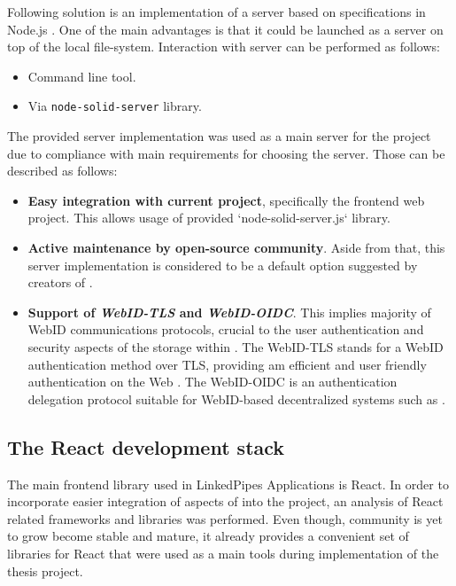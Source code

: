 Following solution is an implementation of a server based on \solid{} specifications in Node.js \cite{node_solid_server}.
One of the main advantages is that it could be launched as a \solid{} server on top of the local file-system. Interaction with server can be performed as follows:
\begin{itemize}
	\item Command line tool.
    \item Via \texttt{node-solid-server} library.
\end{itemize}

The provided server implementation was used as a main \solid{} server for the project due to compliance with main requirements for choosing the server. Those can be described as follows:
\begin{itemize}
	\item \textbf{Easy integration with current \lpa{} project}, specifically the frontend web project. This allows usage of provided `node-solid-server.js` library.
    \item \textbf{Active maintenance by open-source community}. Aside from that, this server implementation is considered to be a default option suggested by creators of \solid{}.
    \item \textbf{Support of \textit{WebID-TLS} and \textit{WebID-OIDC}}. This implies majority of WebID communications protocols,
    crucial to the user authentication and security aspects of the storage within \lpa{}. The WebID-TLS stands for a WebID authentication method over TLS, providing am efficient and user friendly authentication on the Web \cite{webid_tls}. The WebID-OIDC is an authentication delegation protocol suitable for WebID-based decentralized systems such as \solid{} \cite{webid_oidc}.
\end{itemize}

\subsection{The \solid{} React development stack}

The main frontend library used in LinkedPipes Applications is React. In order to incorporate easier integration of aspects of \solid{} into the project, an analysis of React related \solid{} frameworks and libraries was performed. Even though, \solid{} community is yet to grow become stable and mature, it already provides a convenient set of libraries for React that were used as a main tools during implementation of the thesis project. 


